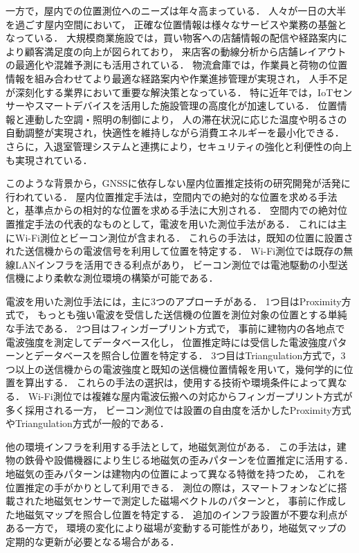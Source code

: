 一方で，屋内での位置測位へのニーズは年々高まっている．
人々が一日の大半を過ごす屋内空間において，
正確な位置情報は様々なサービスや業務の基盤となっている．
大規模商業施設では，買い物客への店舗情報の配信や経路案内により顧客満足度の向上が図られており\cite{burasapo}，
来店客の動線分析から店舗レイアウトの最適化や混雑予測にも活用されている．
物流倉庫では，作業員と荷物の位置情報を組み合わせてより最適な経路案内や作業進捗管理が実現され，
人手不足が深刻化する業界において重要な解決策となっている．
特に近年では，IoTセンサーやスマートデバイスを活用した施設管理の高度化が加速している．
位置情報と連動した空調・照明の制御により，
人の滞在状況に応じた温度や明るさの自動調整が実現され，快適性を維持しながら消費エネルギーを最小化できる．
さらに，入退室管理システムと連携により，セキュリティの強化と利便性の向上も実現されている．

このような背景から，GNSSに依存しない屋内位置推定技術の研究開発が活発に行われている．
屋内位置推定手法は，空間内での絶対的な位置を求める手法と，基準点からの相対的な位置を求める手法に大別される．
空間内での絶対位置推定手法の代表的なものとして，電波を用いた測位手法がある．
これには主にWi-Fi測位とビーコン測位が含まれる．
これらの手法は，既知の位置に設置された送信機からの電波信号を利用して位置を特定する．
Wi-Fi測位では既存の無線LANインフラを活用できる利点があり，
ビーコン測位では電池駆動の小型送信機により柔軟な測位環境の構築が可能である．


電波を用いた測位手法には，主に3つのアプローチがある．
1つ目はProximity方式で，
もっとも強い電波を受信した送信機の位置を測位対象の位置とする単純な手法である．
2つ目はフィンガープリント方式で，
事前に建物内の各地点で電波強度を測定してデータベース化し，
位置推定時には受信した電波強度パターンとデータベースを照合し位置を特定する．
3つ目はTriangulation方式で，3つ以上の送信機からの電波強度と既知の送信機位置情報を用いて，幾何学的に位置を算出する．
これらの手法の選択は，使用する技術や環境条件によって異なる．
Wi-Fi測位では複雑な屋内電波伝搬への対応からフィンガープリント方式が多く採用される一方，
ビーコン測位では設置の自由度を活かしたProximity方式やTriangulation方式が一般的である．

他の環境インフラを利用する手法として，地磁気測位がある．
この手法は，建物の鉄骨や設備機器により生じる地磁気の歪みパターンを位置推定に活用する．
地磁気の歪みパターンは建物内の位置によって異なる特徴を持つため，
これを位置推定の手がかりとして利用できる．
測位の際は，スマートフォンなどに搭載された地磁気センサーで測定した磁場ベクトルのパターンと，
事前に作成した地磁気マップを照合し位置を特定する．
追加のインフラ設置が不要な利点がある一方で，
環境の変化により磁場が変動する可能性があり，地磁気マップの定期的な更新が必要となる場合がある．


